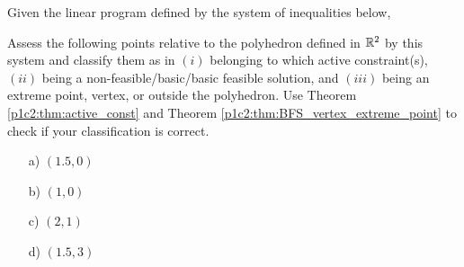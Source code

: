 Given the linear program defined by the system of inequalities below,
%
%
Assess the following points relative to the polyhedron defined in $\mathbb{R}^2$ by this system and classify them as in $(i)$ belonging to which active constraint(s), $(ii)$ being a non-feasible/basic/basic feasible solution, and $(iii)$ being an extreme point, vertex, or outside the polyhedron. Use Theorem \ref{p1c2:thm:active_const} and Theorem \ref{p1c2:thm:BFS_vertex_extreme_point} to check if your classification is correct.

\begin{itemize}
	\item[a)] $(1.5,0)$
	\item[b)] $(1,0)$
	\item[c)] $(2,1)$
	\item[d)] $(1.5,3)$
\end{itemize}